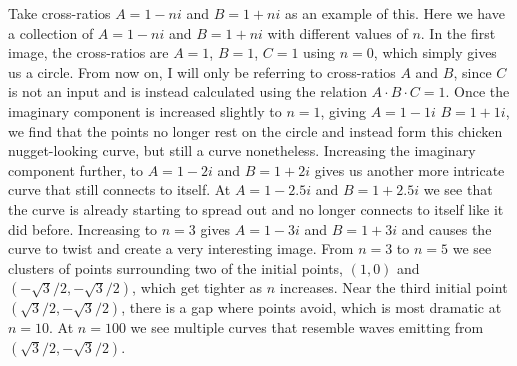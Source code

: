 \documentclass[12pt,a4paper,reqno,parskip=full]{amsart}
\numberwithin{equation}{section}
\theoremstyle{plain}
\theoremstyle{definition}
\begin{document}
Take cross-ratios $A=1-ni$ and $B=1+ni$ as an example of this. Here we have a collection of $A=1-ni$ and $B=1+ni$ with different values of $n$. In the first image, the cross-ratios are $A=1$, $B=1$, $C=1$ using $n=0$, which simply gives us a circle. From now on, I will only be referring to cross-ratios $A$ and $B$, since $C$ is not an input and is instead calculated using the relation $A\cdot B\cdot C=1$. Once the imaginary component is increased slightly to $n=1$, giving $A=1-1i$ $B=1+1i$, we find that the points no longer rest on the circle and instead form this chicken nugget-looking curve, but still a curve nonetheless. Increasing the imaginary component further, to $A=1-2i$ and $B=1+2i$ gives us another more intricate curve that still connects to itself. At $A=1-2.5i$ and $B=1+2.5i$ we see that the curve is already starting to spread out and no longer connects to itself like it did before. Increasing to $n=3$ gives $A=1-3i$ and $B=1+3i$ and causes the curve to twist and create a very interesting image. From $n=3$ to $n=5$ we see clusters of points surrounding two of the initial points, $(1,0)$ and $(-\sqrt3/2,-\sqrt3/2)$, which get tighter as $n$ increases. Near the third initial point $(\sqrt3/2,-\sqrt3/2)$, there is a gap where points avoid, which is most dramatic at $n=10$. At $n=100$ we see multiple curves that resemble waves emitting from $(\sqrt3/2,-\sqrt3/2)$.
\end{document}
